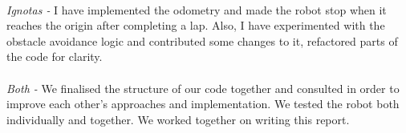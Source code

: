\documentclass[10pt,a4paper]{article}
\begin{document}
\begin{multicols}{2}
\paragraph{} \emph{Ignotas -} I have implemented the odometry
and made the robot stop when it reaches the origin after completing a
lap. Also, I have experimented with the obstacle avoidance logic and
contributed some changes to it, refactored parts of the code for
clarity. 
\paragraph{} \emph{Both -} We finalised the structure of our code together
and consulted in order to improve each other's approaches and
implementation. We tested the robot both individually and together. We
worked together on writing this report.

\end{multicols}
\end{document}

